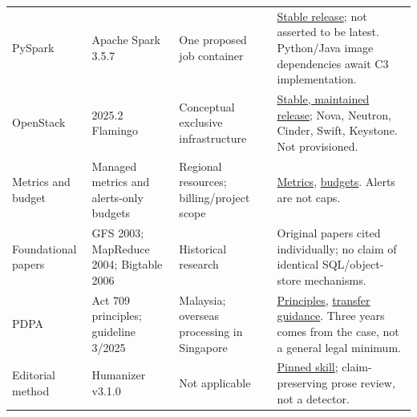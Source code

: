 \begin{longtable}{@{}p{.19\linewidth}p{.25\linewidth}p{.20\linewidth}p{.27\linewidth}@{}}
PySpark & Apache Spark 3.5.7 & One proposed job container & \href{https://spark.apache.org/releases/spark-release-3-5-7.html}{Stable release}; not asserted to be latest. Python/Java image dependencies await C3 implementation. \\
OpenStack & 2025.2 Flamingo & Conceptual exclusive infrastructure & \href{https://releases.openstack.org/flamingo/}{Stable, maintained release}; Nova, Neutron, Cinder, Swift, Keystone. Not provisioned. \\
Metrics and budget & Managed metrics and alerts-only budgets & Regional resources; billing/project scope & \href{https://docs.cloud.google.com/run/docs/monitoring}{Metrics}, \href{https://docs.cloud.google.com/billing/docs/how-to/budgets}{budgets}. Alerts are not caps. \\
Foundational papers & GFS 2003; MapReduce 2004; Bigtable 2006 & Historical research & Original papers cited individually; no claim of identical SQL/object-store mechanisms. \\
PDPA & Act 709 principles; guideline 3/2025 & Malaysia; overseas processing in Singapore & \href{https://www.pdp.gov.my/en/principles-of-personal-data-protection/}{Principles}, \href{https://www.pdp.gov.my/ppdpv1/wp-content/uploads/2025/08/GP_CBPDT_EN.pdf}{transfer guidance}. Three years comes from the case, not a general legal minimum. \\
Editorial method & Humanizer v3.1.0 & Not applicable & \href{https://github.com/blader/humanizer/blob/v3.1.0/SKILL.md}{Pinned skill}; claim-preserving prose review, not a detector. \\
\bottomrule
\end{longtable}
\normalsize

